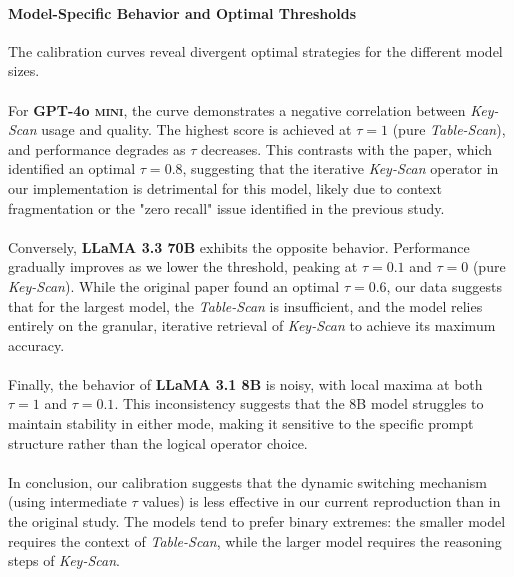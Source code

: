 \paragraph{Model-Specific Behavior and Optimal Thresholds}
The calibration curves reveal divergent optimal strategies for the different model sizes.\\\\
For \textbf{GPT-4o \textsc{mini}}, the curve demonstrates a negative correlation between \textit{Key-Scan} usage and quality. The highest score is achieved at $\tau=1$ (pure \textit{Table-Scan}), and performance degrades as $\tau$ decreases. This contrasts with the paper, which identified an optimal $\tau=0.8$, suggesting that the iterative \textit{Key-Scan} operator in our implementation is detrimental for this model, likely due to context fragmentation or the "zero recall" issue identified in the previous study.
\\\\
Conversely, \textbf{LLaMA 3.3 70B} exhibits the opposite behavior. Performance gradually improves as we lower the threshold, peaking at $\tau=0.1$ and $\tau=0$ (pure \textit{Key-Scan}). While the original paper found an optimal $\tau=0.6$, our data suggests that for the largest model, the \textit{Table-Scan} is insufficient, and the model relies entirely on the granular, iterative retrieval of \textit{Key-Scan} to achieve its maximum accuracy. 
\\\\
Finally, the behavior of \textbf{LLaMA 3.1 8B} is noisy, with local maxima at both $\tau=1$ and $\tau=0.1$. This inconsistency suggests that the 8B model struggles to maintain stability in either mode, making it sensitive to the specific prompt structure rather than the logical operator choice.
\\\\
In conclusion, our calibration suggests that the dynamic switching mechanism (using intermediate $\tau$ values) is less effective in our current reproduction than in the original study. The models tend to prefer binary extremes: the smaller model requires the context of \textit{Table-Scan}, while the larger model requires the reasoning steps of \textit{Key-Scan}.

